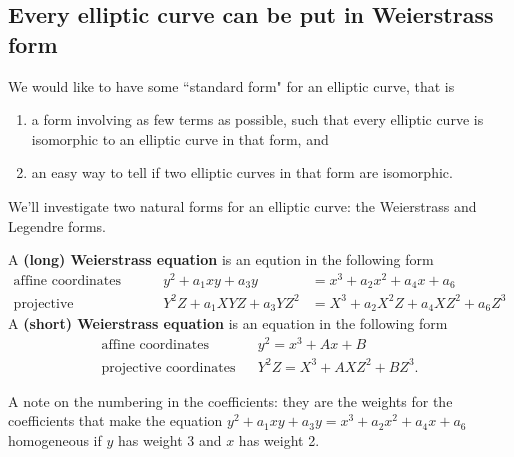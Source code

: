 \subsection{Every elliptic curve can be put in Weierstrass form}
We would like to have some ``standard form" for an elliptic curve, that is
\begin{enumerate}
\item
a form involving as few terms as possible, such that every elliptic curve is isomorphic to an elliptic curve in that form, and
\item
an easy way to tell if two elliptic curves in that form are isomorphic.
\end{enumerate}
We'll investigate two natural forms for an elliptic curve: the Weierstrass and Legendre forms.
\begin{df}
A \textbf{(long) Weierstrass equation} is an eqution in the following form
\begin{align*}
\text{affine coordinates}&& y^2+a_1xy+a_3y&=x^3+a_2x^2+a_4x+a_6\\
\text{projective coordinates}&& Y^2Z+a_1XYZ+a_3YZ^2&=X^3+a_2X^2Z+a_4XZ^2+a_6Z^3
\end{align*}
A \textbf{(short) Weierstrass equation} is an equation in the following form
\begin{align*}
\text{affine coordinates}&& y^2=x^3+Ax+B\\
\text{projective coordinates}&& Y^2Z=X^3+AXZ^2+BZ^3.
\end{align*}
\end{df}
A note on the numbering in the coefficients: they are the weights for the coefficients that make the equation $y^2+a_1xy+a_3y=x^3+a_2x^2+a_4x+a_6$ homogeneous if $y$ has weight 3 and $x$ has weight 2.

